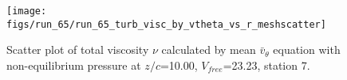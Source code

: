 \begin{figure}[H]
\centering
\texttt{[image: figs/run\_65/run\_65\_turb\_visc\_by\_vtheta\_vs\_r\_meshscatter]}
\caption{Scatter plot of total viscosity $\nu$ calculated by mean $\bar{v}_{\theta}$ equation with non-equilibrium pressure at $z/c$=10.00, $V_{free}$=23.23, station 7.}
\label{fig:run_65_turb_visc_by_vtheta_vs_r_meshscatter}
\end{figure}


